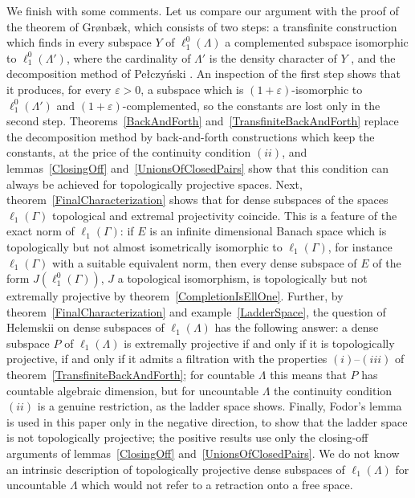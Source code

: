 \documentclass[12pt]{article}
\newcommand{\lo}[1]{\ell_1^0(#1)}
\newcommand{\ellone}[1]{\ell_1(#1)}
\begin{document}
We finish with some comments. Let us compare our argument with the proof
of the theorem of Gr{\o}nb{\ae}k, which consists of two steps: a transfinite
construction which finds in every subspace $Y$ of $\lo{\Lambda}$ a
complemented subspace isomorphic to $\lo{\Lambda'}$, where the cardinality of
$\Lambda'$ is the density character of $Y$
\cite[proposition 2.2]{GronLiftProbNormSp}, and the decomposition method of
Pe{\l}czy\'nski \cite[proposition 2.3]{GronLiftProbNormSp}. An inspection of
the first step shows that it produces, for every $\varepsilon>0$, a subspace
which is $(1+\varepsilon)$-isomorphic to $\lo{\Lambda'}$ and
$(1+\varepsilon)$-complemented, so the constants are lost only in the second
step. Theorems~\ref{BackAndForth} and~\ref{TransfiniteBackAndForth} replace
the decomposition method by back-and-forth constructions which keep the
constants, at the price of the continuity condition $(ii)$, and
lemmas~\ref{ClosingOff} and~\ref{UnionsOfClosedPairs} show that this
condition can always be achieved for topologically projective spaces. Next,
theorem~\ref{FinalCharacterization}
shows that for dense subspaces of the spaces $\ellone{\Gamma}$ topological and
extremal projectivity coincide. This is a feature of the exact norm of
$\ellone{\Gamma}$: if $E$ is an infinite dimensional Banach space which is
topologically but not almost isometrically isomorphic to $\ellone{\Gamma}$,
for instance $\ellone{\Gamma}$ with a suitable equivalent norm, then every
dense subspace of $E$ of the form $J(\lo{\Gamma})$, $J$ a topological
isomorphism, is topologically but not extremally projective by
theorem~\ref{CompletionIsEllOne}. Further, by theorem~\ref{FinalCharacterization}
and example~\ref{LadderSpace}, the question of Helemskii on dense subspaces of
$\ellone{\Lambda}$ has the following answer: a dense subspace $P$ of
$\ellone{\Lambda}$ is extremally projective if and only if it is
topologically projective, if and only if it admits a filtration with the
properties $(i)$--$(iii)$ of theorem~\ref{TransfiniteBackAndForth}; for
countable $\Lambda$ this means that $P$ has countable algebraic dimension, but
for uncountable $\Lambda$ the continuity condition $(ii)$ is a genuine
restriction, as the ladder space shows. Finally, Fodor's lemma is used in this
paper only in the negative direction, to show that the ladder space is not
topologically projective; the positive results use only the closing-off
arguments of lemmas~\ref{ClosingOff} and~\ref{UnionsOfClosedPairs}. We do not
know an intrinsic description of topologically projective dense subspaces of
$\ellone{\Lambda}$ for uncountable $\Lambda$ which would not refer to a
retraction onto a free space.
\end{document}
